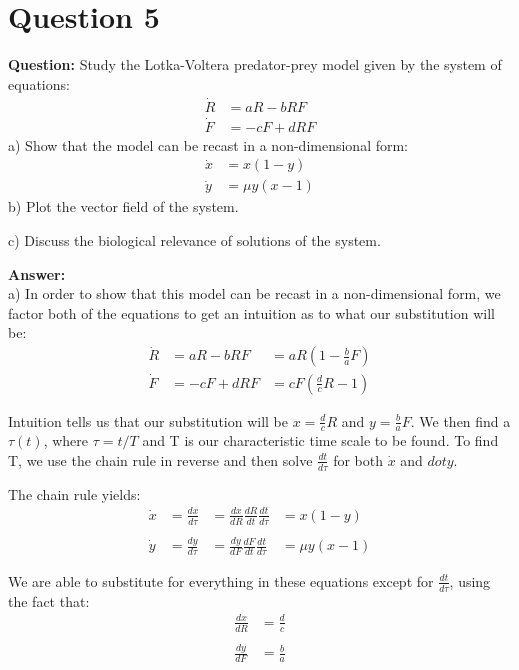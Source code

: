 \documentclass[12pt]{article}
\newenvironment{myenv}{\begin{adjustwidth}{1cm}{}}{\end{adjustwidth}}
\begin{document}
\section*{Question 5}
\begin{myenv}
\textbf{Question:} Study the Lotka-Voltera predator-prey model given by the system of equations:
\begin{alignat*}{3}
\dot{R} &= aR - bRF \\
\dot{F} &= -cF + dRF
\end{alignat*}
a) Show that the model can be recast in a non-dimensional form:
\begin{alignat*}{3}
\dot{x} &= x(1-y) \\
\dot{y} &= \mu y(x-1)
\end{alignat*}
b) Plot the vector field of the system.

c) Discuss the biological relevance of solutions of the system.

\textbf{Answer:} \\
a) In order to show that this model can be recast in a non-dimensional form, we factor both of the equations to get an intuition as to what our substitution will be:
\begin{alignat*}{3}
\dot{R} &= aR - bRF &= aR(1-\frac{b}{a}F) \\
\dot{F} &= -cF + dRF &= cF(\frac{d}{c}R-1)
\end{alignat*}

Intuition tells us that our substitution will be $x = \frac{d}{c}R$ and $y = \frac{b}{a}F$. We then find a $\tau(t)$, where $\tau=t/T$ and T is our characteristic time scale to be found. To find T, we use the chain rule in reverse and then solve $\frac{dt}{d\tau}$ for both $\dot{x}$ and $dot{y}$.

The chain rule yields:
\begin{alignat*}{3}
\dot{x} &= \frac{dx}{d\tau} &= \frac{dx}{dR} \frac{dR}{dt} \frac{dt}{d\tau} &= x(1-y) \\
\\
\dot{y} &= \frac{dy}{d\tau} &= \frac{dy}{dF} \frac{dF}{dt} \frac{dt}{d\tau} &= \mu y(x-1)
\end{alignat*}

We are able to substitute for everything in these equations except for $\frac{dt}{d\tau}$, using the fact that:
\begin{alignat*}{3}
\frac{dx}{dR} &= \frac{d}{c} \\
\\
\frac{dy}{dF} &= \frac{b}{a}
\end{alignat*}


\end{myenv}
\end{document}
